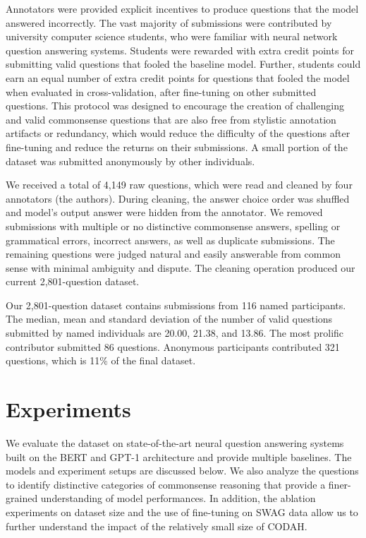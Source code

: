 \documentclass[11pt,a4paper]{article}
\begin{document}
    Annotators were provided explicit incentives to produce questions that the model answered incorrectly. The vast majority of submissions were contributed by university computer science students, who were familiar with neural network question answering systems.  Students were rewarded with extra credit points for submitting valid questions that fooled the baseline model.  Further, students could earn an equal number of extra credit points for questions that fooled the model when evaluated in cross-validation, after fine-tuning on other submitted questions.  This protocol was designed to encourage the creation of challenging and valid commonsense questions that are also free from stylistic annotation artifacts or redundancy, which would reduce the difficulty of the questions after fine-tuning and reduce the returns on their submissions. A small portion of the dataset was submitted anonymously by other individuals.

    We received a total of 4,149 raw questions, which were read and cleaned by four annotators (the authors). During cleaning, the answer choice order was shuffled and model's output answer were hidden from the annotator. We removed submissions with multiple or no distinctive commonsense answers, spelling or grammatical errors, incorrect answers, as well as duplicate submissions. The remaining questions were judged natural and easily answerable from common sense with minimal ambiguity and dispute. The cleaning operation produced our current 2,801-question dataset.
    
    Our 2,801-question dataset contains submissions from 116 named participants. The median, mean and standard deviation of the number of valid questions submitted by named individuals are 20.00, 21.38, and 13.86. The most prolific contributor submitted 86 questions. Anonymous participants contributed 321 questions, which is 11\% of the final dataset.
    
\section{Experiments}
    We evaluate the dataset on state-of-the-art neural question answering systems built on the BERT and GPT-1 architecture and provide multiple baselines. The models and experiment setups are discussed below. We also analyze the questions to identify distinctive categories of commonsense reasoning that provide a finer-grained understanding of model performances. In addition, the ablation experiments on dataset size and the use of fine-tuning on SWAG data allow us to further understand the impact of the relatively small size of CODAH.
    
\end{document}
